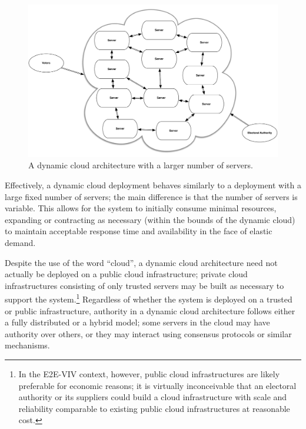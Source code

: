 \begin{figure}
\begin{center}
\includegraphics[width=6.5in]{architecture_resources/dynamic-cloud-large.pdf}
\end{center}
\caption{A dynamic cloud architecture with a larger number of servers.}
\label{figure:arch-dynamic-cloud-large}
\end{figure}

Effectively, a dynamic cloud deployment behaves similarly to a
deployment with a large fixed number of servers; the main difference
is that the number of servers is variable. This allows for the system
to initially consume minimal resources, expanding or contracting as
necessary (within the bounds of the dynamic cloud) to maintain
acceptable response time and availability in the face of elastic
demand.

Despite the use of the word ``cloud'', a dynamic cloud architecture
need not actually be deployed on a public cloud infrastructure;
private cloud infrastructures consisting of only trusted servers may
be built as necessary to support the system.\footnote{In the E2E-VIV
  context, however, public cloud infrastructures are likely preferable
  for economic reasons; it is virtually inconceivable that an
  electoral authority or its suppliers could build a cloud
  infrastructure with scale and reliability comparable to existing
  public cloud infrastructures at reasonable cost.}  Regardless of
whether the system is deployed on a trusted or public infrastructure,
authority in a dynamic cloud architecture follows either a fully
distributed or a hybrid model; some servers in the cloud may have
authority over others, or they may interact using consensus protocols
or similar mechanisms.

